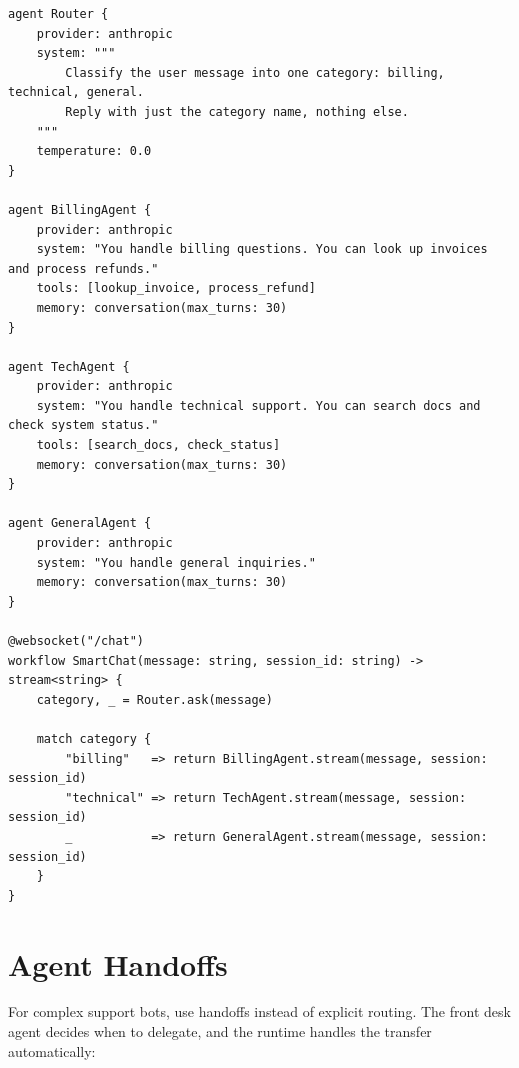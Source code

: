 \begin{lstlisting}
agent Router {
    provider: anthropic
    system: """
        Classify the user message into one category: billing, technical, general.
        Reply with just the category name, nothing else.
    """
    temperature: 0.0
}

agent BillingAgent {
    provider: anthropic
    system: "You handle billing questions. You can look up invoices and process refunds."
    tools: [lookup_invoice, process_refund]
    memory: conversation(max_turns: 30)
}

agent TechAgent {
    provider: anthropic
    system: "You handle technical support. You can search docs and check system status."
    tools: [search_docs, check_status]
    memory: conversation(max_turns: 30)
}

agent GeneralAgent {
    provider: anthropic
    system: "You handle general inquiries."
    memory: conversation(max_turns: 30)
}

@websocket("/chat")
workflow SmartChat(message: string, session_id: string) -> stream<string> {
    category, _ = Router.ask(message)

    match category {
        "billing"   => return BillingAgent.stream(message, session: session_id)
        "technical" => return TechAgent.stream(message, session: session_id)
        _           => return GeneralAgent.stream(message, session: session_id)
    }
}
\end{lstlisting}

\section{Agent Handoffs}

For complex support bots, use handoffs instead of explicit routing. The front desk agent decides when to delegate, and the runtime handles the transfer automatically:

